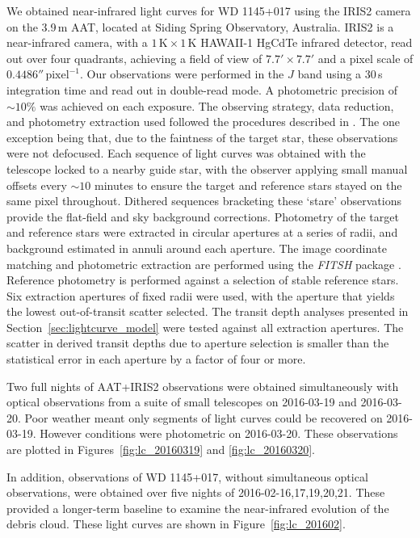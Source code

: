 \documentclass[apj]{emulateapj}
\begin{document}
We obtained near-infrared light curves for WD 1145+017 using the IRIS2 camera \citep{2004SPIE.5492..998T} on the 3.9\,m AAT, located at Siding Spring Observatory, Australia. IRIS2 is a near-infrared camera, with a $1\,\mathrm{K} \times 1\,\mathrm{K}$ HAWAII-1 HgCdTe infrared detector, read out over four quadrants, achieving a field of view of $7.7' \times 7.7 '$ and a pixel scale of $0.4486''\,\mathrm{pixel}^{-1}$. Our observations were performed in the $J$ band using a 30\,s integration time and read out in double-read mode. A photometric precision of $\sim 10\mathrm{\%}$ was achieved on each exposure. The observing strategy, data reduction, and photometry extraction used followed the procedures described in \citet{2014MNRAS.445.2746Z,2015MNRAS.454.3002Z}. The one exception being that, due to the faintness of the target star, these observations were not defocused. Each sequence of light curves was obtained with the telescope locked to a nearby guide star, with the observer applying small manual offsets every $\sim 10$ minutes to ensure the target and reference stars stayed on the same pixel throughout. Dithered sequences bracketing these `stare' observations provide the flat-field and sky background corrections. Photometry of the target and reference stars were extracted in circular apertures at a series of radii, and background estimated in annuli around each aperture. The image coordinate matching and photometric extraction are performed using the \emph{FITSH} package \citep{2012MNRAS.421.1825P}. Reference photometry is performed against a selection of stable reference stars. Six extraction apertures of fixed radii were used, with the aperture that yields the lowest out-of-transit scatter selected. The transit depth analyses presented in Section~\ref{sec:lightcurve_model} were tested against all extraction apertures. The scatter in derived transit depths due to aperture selection is smaller than the statistical error in each aperture by a factor of four or more. 

Two full nights of AAT+IRIS2 observations were obtained simultaneously with optical observations from a suite of small telescopes on 2016-03-19 and 2016-03-20. Poor weather meant only segments of light curves could be recovered on 2016-03-19. However conditions were photometric on 2016-03-20. These observations are plotted in Figures~\ref{fig:lc_20160319} and \ref{fig:lc_20160320}. 

In addition, observations of WD 1145+017, without simultaneous optical observations, were obtained over five nights of 2016-02-16,17,19,20,21. These provided a longer-term baseline to examine the near-infrared evolution of the debris cloud. These light curves are shown in Figure~\ref{fig:lc_201602}.
\end{document}
